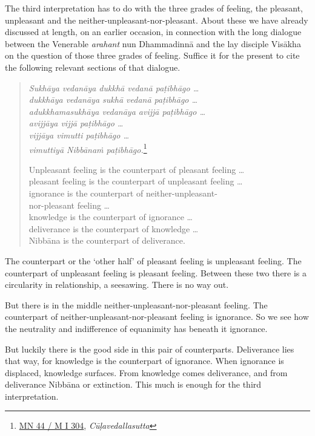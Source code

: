 The third interpretation has to do with the three grades of feeling, the pleasant, unpleasant and the neither-unpleasant-nor-pleasant. About these we have already discussed at length, on an earlier occasion, in connection with the long dialogue between the Venerable \emph{arahant} nun Dhammadinnā and the lay disciple Visākha on the question of those three grades of feeling. Suffice it for the present to cite the following relevant sections of that dialogue.

\begin{quote}
\emph{Sukhāya vedanāya dukkhā vedanā paṭibhāgo \ldots{}}\\
\emph{dukkhāya vedanāya sukhā vedanā paṭibhāgo \ldots{}}\\
\emph{adukkhamasukhāya vedanāya avijjā paṭibhāgo \ldots{}}\\
\emph{avijjāya vijjā paṭibhāgo \ldots{}}\\
\emph{vijjāya vimutti paṭibhāgo \ldots{}}\\
\emph{vimuttiyā Nibbānaṁ paṭibhāgo.}\footnote{\href{https://suttacentral.net/mn44/pli/ms}{MN 44 / M I 304}, \emph{Cūḷavedallasutta}}

Unpleasant feeling is the counterpart of pleasant feeling \ldots{}\\
pleasant feeling is the counterpart of unpleasant feeling \ldots{}\\
ignorance is the counterpart of neither-unpleasant-\\ nor-pleasant feeling \ldots{}\\
knowledge is the counterpart of ignorance \ldots{}\\
deliverance is the counterpart of knowledge \ldots{}\\
Nibbāna is the counterpart of deliverance.
\end{quote}

The counterpart or the `other half' of pleasant feeling is unpleasant feeling. The counterpart of unpleasant feeling is pleasant feeling. Between these two there is a circularity in relationship, a seesawing. There is no way out.

But there is in the middle neither-unpleasant-nor-pleasant feeling. The counterpart of neither-unpleasant-nor-pleasant feeling is ignorance. So we see how the neutrality and indifference of equanimity has beneath it ignorance.

But luckily there is the good side in this pair of counterparts. Deliverance lies that way, for knowledge is the counterpart of ignorance. When ignorance is displaced, knowledge surfaces. From knowledge comes deliverance, and from deliverance Nibbāna or extinction. This much is enough for the third interpretation.

